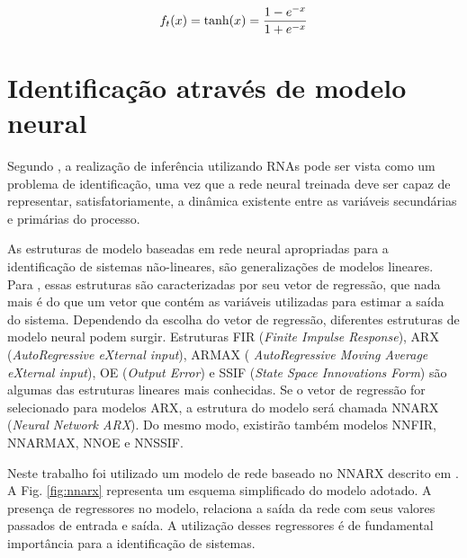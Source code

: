 
\begin{equation}
\label{eq:tan}
f_t(x) = \text{tanh}(x) = \frac{1-e^{-x}}{1+e^{-x}}\\
\end{equation}


\section{Identificação através de modelo neural}
Segundo , a realização de inferência utilizando RNAs
pode ser vista como um problema de identificação, uma vez que a rede neural
treinada deve ser capaz de representar, satisfatoriamente, a dinâmica existente
entre as variáveis secundárias e primárias do processo.

As estruturas de modelo baseadas em rede neural apropriadas para a identificação
de sistemas não-lineares, são generalizações de modelos lineares. Para
, essas estruturas são caracterizadas por seu vetor de
regressão, que nada mais é do que um vetor que contém as variáveis utilizadas
para estimar a saída do sistema. Dependendo da escolha do vetor de regressão,
diferentes estruturas de modelo neural podem surgir. Estruturas FIR ({\it Finite
Impulse Response}), ARX ({\it AutoRegressive eXternal input}), ARMAX ({\it
AutoRegressive Moving Average eXternal input}), OE ({\it Output Error}) e SSIF
({\it State Space Innovations Form}) são algumas das estruturas lineares mais
conhecidas. Se o vetor de regressão for selecionado para modelos ARX, a
estrutura do modelo será chamada NNARX ({\it Neural Network ARX}). Do mesmo
modo, existirão também modelos NNFIR, NNARMAX, NNOE e NNSSIF.


Neste trabalho foi utilizado um modelo de rede baseado no NNARX descrito em
. A Fig. \ref{fig:nnarx} representa um esquema
simplificado do modelo adotado. A presença de regressores no modelo, relaciona a
saída da rede com seus valores passados de entrada e saída. A utilização desses
regressores é de fundamental importância para a identificação de sistemas.

